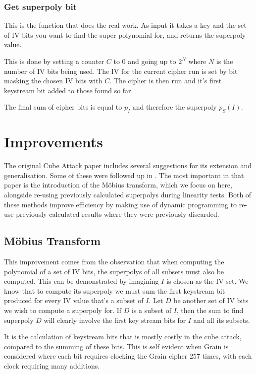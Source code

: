 \documentclass{report}
\let\Oldsection\section
\renewcommand{\section}{\FloatBarrier\Oldsection}
\let\Oldsubsection\subsection
\renewcommand{\subsection}{\FloatBarrier\Oldsubsection}
\let\Oldsubsubsection\subsubsection
\renewcommand{\subsubsection}{\FloatBarrier\Oldsubsubsection}
\begin{document}
\subsubsection{Get superpoly bit}
This is the function that does the real work. As input it takes a key and the set of IV bits you want to find the super polynomial for, and returns the superpoly value.

This is done by setting a counter $C$ to 0 and going up to $2^N$ where $N$ is the number of IV bits being used. The IV for the current cipher run is set by bit masking the chosen IV bits with $C$. The cipher is then run and it's first keystream bit added to those found so far.

The final sum of cipher bits is equal to $p_I$ and therefore the superpoly $p_S(I)$.
\section{Improvements}
The original Cube Attack paper includes several suggestions for its extension and generalisation. Some of these were followed up in \cite{MobiusTransform}. The most important in that paper is the introduction of the M\"{o}bius transform, which we focus on here, alongside re-using previously calculated superpolys during linearity tests. Both of these methods improve efficiency by making use of dynamic programming to re-use previously calculated results where they were previously discarded.
\subsection{M\"{o}bius Transform}
This improvement comes from the observation that when computing the polynomial of a set of IV bits, the superpolys of all subsets must also be computed. This can be demonstrated by imagining $I$ is chosen as the IV set. We know that to compute its superpoly we must sum the first keystream bit produced for every IV value that's a subset of $I$. Let $D$ be another set of IV bits we wish to compute a superpoly for. If $D$ is a subset of $I$, then the sum to find superpoly $D$ will clearly involve the first key stream bits for $I$ and all its  subsets.

It is the calculation of keystream bits that is mostly costly in the cube attack, compared to the summing of these bits. This is self evident when Grain is considered where each bit requires clocking the Grain cipher 257 times, with each clock requiring many additions.
\end{document}
